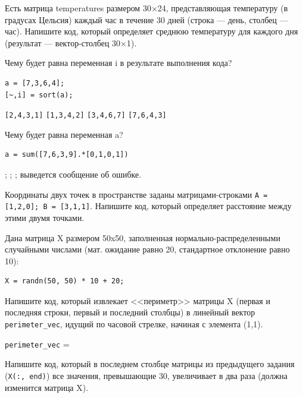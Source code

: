 \documentclass[addpoints,12pt]{exam}
\begin{document}
\begin{questions}
\question[1] Есть матрица temperatures размером 30×24, представляющая температуру (в градусах Цельсия) каждый час в течение 30 дней (строка — день, столбец — час). Напишите код, который определяет среднюю температуру для каждого дня (результат — вектор-столбец 30×1).
\begin{solutionorlines}[2cm]
\end{solutionorlines}
 
\question[1] Чему будет равна переменная i в результате выполнения кода?
\begin{lstlisting}
a = [7,3,6,4];
[~,i] = sort(a);
\end{lstlisting}
\begin{checkboxes}
\CorrectChoice \texttt{[2,4,3,1]}
\choice \texttt{[1,3,4,2]}
\choice \texttt{[3,4,6,7]}
\choice \texttt{[7,6,4,3]}
\end{checkboxes}

\question[1] Чему будет равна переменная a?
\begin{lstlisting}
a = sum([7,6,3,9].*[0,1,0,1])
\end{lstlisting}    
\begin{checkboxes}
;
;
;
\choice выведется сообщение об ошибке.
\end{checkboxes}

\question[1] Координаты двух точек в пространстве заданы матрицами-строками \texttt{A = [1,2,0]; B = [3,1,1]}. Напишите код, который определяет расстояние между этими двумя точками.
\begin{solutionorlines}[1cm]
\end{solutionorlines}

\question[1] 
Дана матрица X размером 50x50, заполненная нормально-распределенными случайными числами (мат. ожидание равно 20, стандартное отклонение равно 10): 
\begin{lstlisting}
X = randn(50, 50) * 10 + 20; 
\end{lstlisting}
Напишите код, который извлекает <<периметр>> матрицы X (первая и последняя строки, первый и последний столбцы) в линейный вектор \texttt{perimeter\_vec}, идущий по часовой стрелке, начиная с элемента (1,1).
\begin{solutionorlines}[2cm]
    \texttt{perimeter\_vec} = 
\end{solutionorlines}

\question[1] 
Напишите код, который в последнем столбце матрицы из предыдущего задания (\texttt{X(:, end)}) все значения, превышающие 30, увеличивает в два раза (должна изменится матрица X).
\begin{solutionorlines}[2cm]
\end{solutionorlines}

\end{questions}


\vfill

\begin{center}
\gradetable[h][questions]
\end{center}

\end{document}
